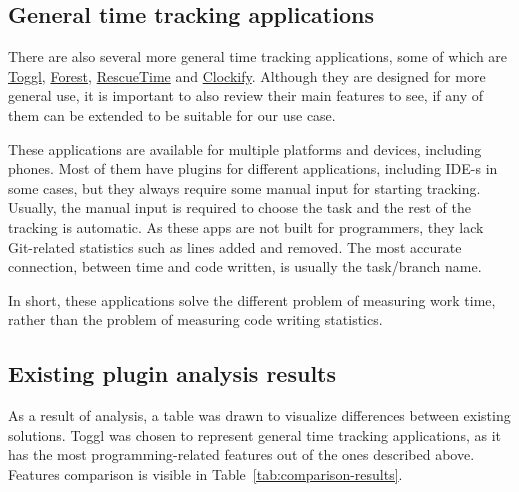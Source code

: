 \subsection{General time tracking applications}\label{subsec:general-time-tracking-alternatives}
There are also several more general time tracking applications, some of which are
\href{https://toggl.com/}{Toggl}, \href{https://www.forestapp.cc/}{Forest}, \href{https://www.rescuetime.com/}{RescueTime} and
\href{https://clockify.me/}{Clockify}.
Although they are designed for more general use, it is important to also review their main features to see,
if any of them can be extended to be suitable for our use case.
\cite{general-time-tracking-alternatives}

These applications are available for multiple platforms and devices, including phones.
Most of them have plugins for different applications, including IDE-s in some cases, but they always require some manual
input for starting tracking.
Usually, the manual input is required to choose the task and the rest of the tracking is automatic.
As these apps are not built for programmers, they lack Git-related statistics such as lines added and removed.
The most accurate connection, between time and code written, is usually the task/branch name.

In short, these applications solve the different problem of measuring work time, rather than the problem of measuring
code writing statistics.

\subsection{Existing plugin analysis results}\label{subsec:existing-plugin-analysis-results}
As a result of analysis, a table was drawn to visualize differences between existing solutions.
Toggl was chosen to represent general time tracking applications, as it has the most programming-related features
out of the ones described above.
Features comparison is visible in Table~\ref{tab:comparison-results}.


